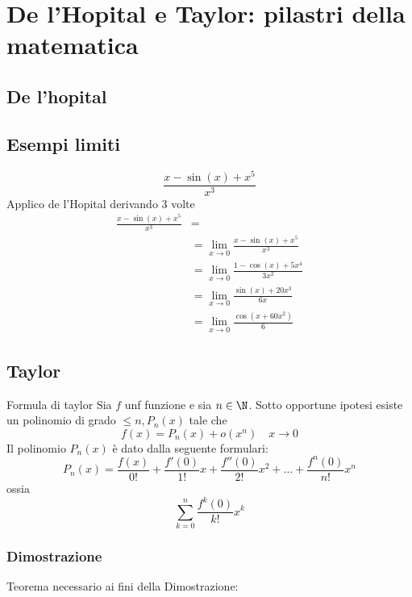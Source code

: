 \section{De l'Hopital e Taylor: pilastri della matematica}
\subsection{De l'hopital}
\subsection{Esempi limiti}

\[
	\frac{x - \sin  \left( x \right)  + x^{5}}{x^{3}}
\]
Applico de l'Hopital derivando 3 volte
\begin{align*}
	\frac{x - \sin  \left( x \right)  + x^{5}}{x^{3}} & =                                                                   \\
	                                                  & = \lim_{x \to 0} \frac{x - \sin \left( x \right)  + x^{5}}{x^3}     \\
	                                                  & = \lim_{x \to 0} \frac{1 - \cos \left( x \right)  + 5x^{4}}{3 x ^2} \\
	                                                  & = \lim_{x \to 0} \frac{\sin \left( x \right)  + 20 x^3}{6x}         \\
	                                                  & =\lim_{x \to 0} \frac{\cos \left( x + 60x^2 \right) }{6}
\end{align*}

\subsection{Taylor}
\begin{teorema}{Formula di taylor}
	Sia $f $ unf funzione e sia $n \in  \N$. Sotto opportune ipotesi esiste un polinomio di grado $\le n, P_n \left( x \right) $ tale che
	\[
		f\left( x \right) = P_n\left( x \right)  + o\left( x^{n} \right) \quad x \to 0
	\]
	Il polinomio $P_n\left( x \right) $ è dato dalla seguente formulari:
	\[
		P_n \left( x \right)  = \frac{f\left( x \right) }{0!} + \frac{f'\left( 0 \right)}{1!}x + \frac{f''\left( 0 \right) }{2!}x^2 + \ldots +  \frac{f^{n}\left( 0 \right) }{n!} x^{n}
	\]
	ossia
	\[
		\sum_{k=0}^{n} \frac{f^{k}\left( 0 \right) }{k!}x^{k}
	\]
\end{teorema}

\subsubsection{Dimostrazione}
Teorema necessario ai fini della Dimostrazione:

